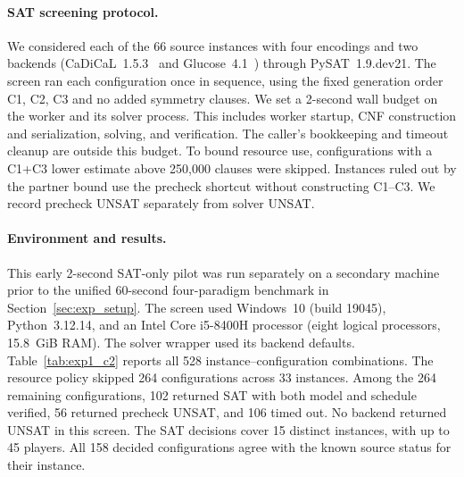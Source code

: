 \documentclass[a4paper,fleqn]{cas-sc}
\begin{document}
\paragraph{SAT screening protocol.}
We considered each of the 66 source instances with four encodings and
two backends (CaDiCaL~1.5.3~\cite{cadical153} and Glucose~4.1~\cite{audemard2018glucose}) through PySAT~1.9.dev21.
The screen ran each configuration once in sequence, using the fixed
generation order C1, C2, C3 and no added symmetry clauses.
We set a 2-second wall budget on the worker and its solver process.
This includes worker startup, CNF construction and serialization,
solving, and verification. The caller's bookkeeping and timeout
cleanup are outside this budget. To bound resource use, configurations
with a C1+C3 lower estimate above 250{,}000 clauses were skipped.
Instances ruled out by the partner bound use the precheck shortcut
without constructing C1--C3. We record precheck UNSAT separately
from solver UNSAT.

\paragraph{Environment and results.}
This early 2-second SAT-only pilot was run separately on a secondary machine prior to the unified 60-second four-paradigm benchmark in Section~\ref{sec:exp_setup}.
The screen used Windows~10 (build 19045), Python~3.12.14,
and an Intel Core i5-8400H processor (eight logical processors, 15.8~GiB
RAM). The solver wrapper used its backend defaults. Table~\ref{tab:exp1_c2}
reports all 528 instance--configuration combinations. The resource policy skipped
264 configurations across 33 instances. Among the
264 remaining configurations, 102 returned SAT with both model
and schedule verified, 56 returned precheck UNSAT, and 106
timed out. No backend returned UNSAT in this screen.
The SAT decisions cover 15 distinct instances, with up to
45 players. All 158 decided configurations agree
with the known source status for their instance.
\end{document}
